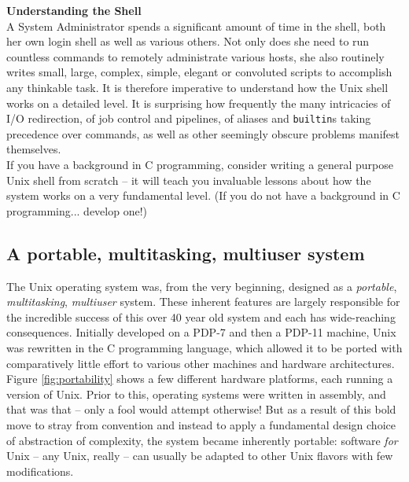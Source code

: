 \begin{sidenote}
{\bf Understanding the Shell} \\
A System Administrator spends a significant amount of
time in the shell, both her own login shell as well as
various others.  Not only does she need to run
countless commands to remotely administrate various
hosts, she also routinely writes small, large,
complex, simple, elegant or convoluted scripts to
accomplish any thinkable task.  It is therefore
imperative to understand how the Unix shell works on a
detailed level.  It is surprising how frequently the
many intricacies of I/O redirection, of job control
and pipelines, of aliases and {\tt builtin}s taking
precedence over commands, as well as other seemingly
obscure problems manifest themselves. \\ [10pt]

If you have a background in C programming, consider
writing a general purpose Unix shell from scratch --
it will teach you invaluable lessons about how the
system works on a very fundamental level.  (If you do
not have a background in C programming... develop
one!)
\end{sidenote}



\subsection{A portable, multitasking, multiuser system}
\label{unix:basics:multi}

The Unix operating system was, from the very
beginning, designed as a {\em portable}, {\em
multitasking}, {\em multiuser} system.  These inherent
features are largely responsible for the incredible
success of this over 40 year old system and each has
wide-reaching consequences.  Initially developed on a
PDP-7 and then a PDP-11
machine, Unix was rewritten in the C
programming language, which allowed it to be ported
with comparatively little effort to various other
machines and hardware architectures. Figure
\ref{fig:portability} shows a few different hardware
platforms, each running a version of Unix.  Prior to
this, operating systems were written in assembly, and
that was that -- only a fool would attempt otherwise!
But as a result of this bold move to stray from
convention and instead to apply a fundamental design
choice of abstraction of complexity, the system became
inherently portable: software {\em for} Unix -- any
Unix, really -- can usually be adapted to other Unix
flavors with few modifications.


